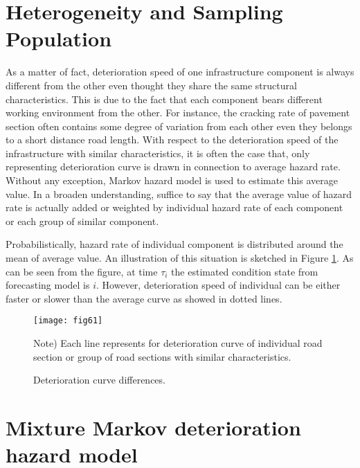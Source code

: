\section{Heterogeneity and Sampling Population}
\label{62}
As a matter of fact, deterioration speed of one infrastructure component is always different from the other even thought they share the same structural characteristics. This is due to the fact that each component bears different working environment from the other. For instance, the cracking rate of pavement section often contains some degree of variation from each other even they belongs to a short distance road length. With respect to the deterioration speed of the infrastructure with similar characteristics, it is often the case that, only representing deterioration curve is drawn in connection to average hazard rate. Without any exception, Markov hazard model is used to estimate this average value. In a broaden understanding, suffice to say that the average value of hazard rate is actually added or weighted by individual hazard rate of each component or each group of similar component. 

Probabilistically, hazard rate of individual component is distributed around the mean of average value. An illustration of this situation is sketched in Figure \ref{fig61}. As can be seen from the figure, at time $\tau_i$ the estimated condition state from forecasting model is $i$. However, deterioration speed of individual can be either faster or slower than the average curve as showed in dotted lines.
%
\begin{figure}[t]
\begin{center}
\texttt{[image: fig61]} 
\end{center}
\footnotesize Note) Each line represents for deterioration curve of individual road section or group of road sections with similar characteristics.
\caption{Deterioration curve differences.}
\label{fig61} 
\end{figure}
%
\section{Mixture Markov deterioration hazard model}
\label{64}
